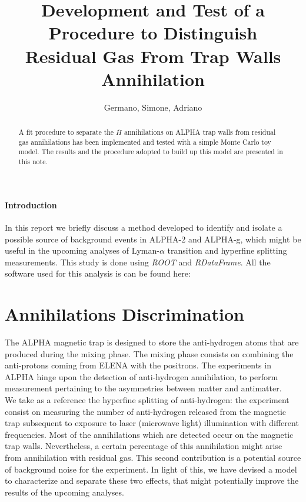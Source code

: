 \documentclass[11pt,a4paper,oneside]{article}
\title{%
 \vspace{-2.0cm}
 Development and Test of a Procedure to Distinguish \\ Residual Gas From Trap Walls Annihilation
}
\date{\vspace{-5ex}}
\author{Germano, Simone, Adriano}
\begin{document}

\maketitle
\begin{abstract}
\centering
A fit procedure to separate the $\overline{H}$ annihilations on ALPHA trap walls from residual gas annihilations has been implemented and tested with a simple Monte Carlo toy model. The results and the procedure adopted to build up this model are presented in this note.
\end{abstract}

\paragraph{Introduction}
In this report we briefly discuss a method developed to identify and isolate a possible source of background events in ALPHA-2 and ALPHA-g, which might be useful in the upcoming analyses of Lyman-$\alpha$ transition  and hyperfine splitting measurements. This study is done using \textit{ROOT} and \textit{RDataFrame}. All the software used for this analysis is can be found here: {}

\section*{Annihilations Discrimination}

The ALPHA magnetic trap is designed to store the anti-hydrogen atoms that are produced during the mixing phase. The mixing phase consists on combining the anti-protons coming from ELENA with the positrons. 
The experiments in ALPHA hinge upon the detection of anti-hydrogen annihilation, to perform measurement pertaining to the asymmetries between matter and antimatter.\\
We take as a reference the hyperfine splitting of anti-hydrogen: the experiment consist on measuring the number of anti-hydrogen released from the magnetic trap subsequent to exposure to laser (microwave light) illumination with different frequencies. Most of the annihilations which are detected occur on the magnetic trap walls. Nevertheless, a certain percentage of this annihilation might arise from annihilation with residual gas. This second contribution is a potential source of background noise for the experiment. In light of this, we have devised a model to characterize and separate these two effects, that might potentially improve the results of the upcoming analyses.
\end{document}
